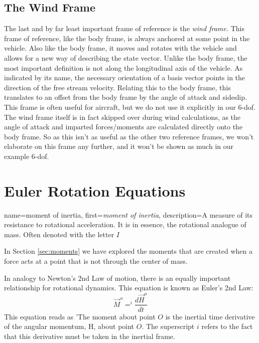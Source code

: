 \documentclass[12pt]{report}
\begin{document}
\subsection{The Wind Frame}
The last and by far least important frame of reference is the \textit{wind frame.} This frame of reference, like the body frame, is always anchored at some point in the vehicle. Also like the body frame, it moves and rotates with the vehicle and allows for a new way of describing the \gls{state vector}. Unlike the body frame, the most important definition is not along the longitudinal axis of the vehicle. As indicated by its name, the necessary orientation of a basis vector points in the direction of the free stream velocity. Relating this to the body frame, this translates to an offset from the body frame by the \gls{angle of attack} and sideslip. This frame is often useful for aircraft, but we do not use it explicitly in our 6-\gls{dof}. The wind frame itself is in fact skipped over during wind calculations, as the \gls{angle of attack} and imparted forces/moments are calculated directly onto the body frame. So as this isn’t as useful as the other two reference frames, we won’t elaborate on this frame any further, and it won’t be shown as much in our example 6-\gls{dof}.

\section{Euler Rotation Equations}\label{Euler Rotation Equations}
{
    name=moment of inertia,
    first={\textit{moment of inertia}},
    description={A measure of its resistance to rotational acceleration. It is in essence, the rotational analogue of mass. Often denoted with the letter $I$}
}

In Section \ref{sec:moments} we have explored the moments that are created when a force acts at a point that is not through the center of mass.

In analogy to Newton's 2nd Law of motion, there is an equally important relationship for rotational dynamics. This equation is known as Euler's 2nd Law:
\begin{equation}\label{eq:Euler 2nd Law}
    \vec{M}^o=^{i}\frac{d\vec{H}^o}{dt}
\end{equation}
This equation reads as 'The moment about point $O$ is the inertial time derivative of the angular momentum, H, about point $O$. The superscript $i$ refers to the fact that this derivative must be taken in the inertial frame.
\end{document}
